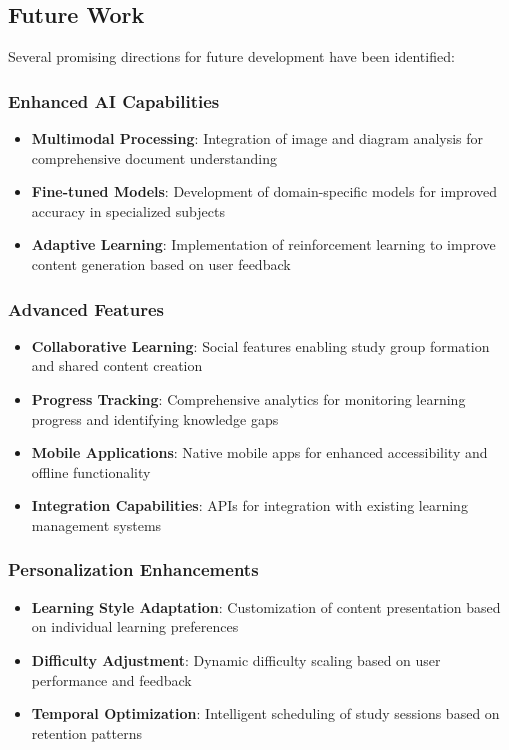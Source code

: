 \documentclass[conference]{IEEEtran}
\begin{document}
\subsection{Future Work}

Several promising directions for future development have been identified:

\subsubsection{Enhanced AI Capabilities}
\begin{itemize}
\item \textbf{Multimodal Processing}: Integration of image and diagram analysis for comprehensive document understanding
\item \textbf{Fine-tuned Models}: Development of domain-specific models for improved accuracy in specialized subjects
\item \textbf{Adaptive Learning}: Implementation of reinforcement learning to improve content generation based on user feedback
\end{itemize}

\subsubsection{Advanced Features}
\begin{itemize}
\item \textbf{Collaborative Learning}: Social features enabling study group formation and shared content creation
\item \textbf{Progress Tracking}: Comprehensive analytics for monitoring learning progress and identifying knowledge gaps
\item \textbf{Mobile Applications}: Native mobile apps for enhanced accessibility and offline functionality
\item \textbf{Integration Capabilities}: APIs for integration with existing learning management systems
\end{itemize}

\subsubsection{Personalization Enhancements}
\begin{itemize}
\item \textbf{Learning Style Adaptation}: Customization of content presentation based on individual learning preferences
\item \textbf{Difficulty Adjustment}: Dynamic difficulty scaling based on user performance and feedback
\item \textbf{Temporal Optimization}: Intelligent scheduling of study sessions based on retention patterns
\end{itemize}
\end{document}

